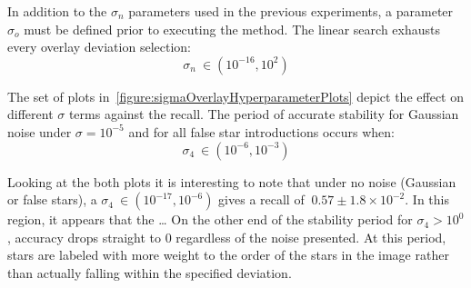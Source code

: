 In addition to the $\sigma_n$ parameters used in the previous experiments, a parameter $\sigma_o$ must be defined
prior to executing the  method.
The linear search exhausts every overlay deviation selection:
\begin{equation}
    \label{eq:linearSearchSigmaOverlay}
    \sigma_n \ \in (10^{-16}, 10^{2})
\end{equation}

\begin{figure}
\end{figure}

The set of plots in~\autoref{figure:sigmaOverlayHyperparameterPlots} depict the effect on different $\sigma$ terms
against the recall.
The period of accurate stability for Gaussian noise under $\sigma = 10^{-5}$ and for all false star introductions occurs
when:
\begin{equation}
    \label{eq:sigmaOverlayStableRegion}
    \sigma_4 \ \in (10^{-6}, 10^{-3})
\end{equation}

Looking at the both plots it is interesting to note that under no noise (Gaussian or false stars), a $\sigma_4 \ \in
(10^{-17}, 10^{-6})$ gives a recall of $~0.57 \pm 1.8 \times 10^{-2}$.
In this region, it appears that the \ldots
On the other end of the stability period for $\sigma_4 > 10^0$, accuracy drops straight to 0 regardless of the noise
presented.
At this period, stars are labeled with more weight to the order of the stars in the image rather than actually falling
within the specified deviation.


